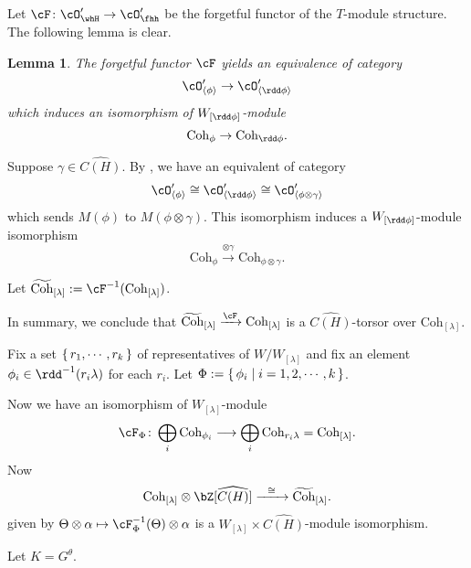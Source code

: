 \documentclass[12pt,a4paper]{amsart}
\numberwithin{equation}{section}
\newtheorem{lem}[thm]{Lemma}
\theoremstyle{remark}
\def\Coh{\mathrm{Coh}}
\def\dphi{\rdd \phi}
\def\whCPH{\widehat{C(H)}}
\begin{document}
Let $\cF\colon \cO'_{\whH}\rightarrow \cO'_{\fhh}$ be the forgetful functor of
the $T$-module structure.
The following lemma is clear.
\begin{lem}\label{lem:eqcat}
  The forgetful functor $\cF$ yields an equivalence of
  category
  \[
    \cO'_{\braket{\phi}}\rightarrow \cO'_{\braket{\rdd\phi}}
  \]
  which induces an isomorphism of $W_{[\dphi]}$-module
  \[
    \Coh_{\phi}\rightarrow \Coh_{\rdd\phi}.
  \]
\end{lem}
Suppose $\gamma\in \whCPH$.
By , we have an equivalent of category
\[
  \cO'_{\braket{\phi}}\cong \cO'_{\braket{\rdd\phi}}\cong \cO'_{\braket{\phi\otimes \gamma}}
\]
which sends $M(\phi)$ to $M(\phi\otimes \gamma)$.
This isomorphism induces a $W_{[\dphi]}$-module isomorphism
\[
    \Coh_{\phi}\xrightarrow{\otimes \gamma} \Coh_{\phi\otimes \gamma}.
\]

\def\tCoh{\widetilde{\Coh}}
Let $\tCoh_{[\lambda]}:= \cF^{-1}(\Coh_{[\lambda]})$.

In summary, we conclude that
$
\tCoh_{[\lambda]}\xrightarrow{\cF} \Coh_{[\lambda]}
$
is a $\whCPH$-torsor over $\Coh_{[\lambda]}$.

Fix a set $\set{r_{1}, \cdots, r_{k}}$ of representatives of
$W/W_{[\lambda]}$ and fix
an element $\phi_{i}\in \rdd^{-1}(r_{i}\lambda)$ for each $r_{i}$.
Let $\Phi := \set{\phi_{i}|i=1, 2, \cdots, k}$.

Now we have an isomorphism of $W_{[\lambda]}$-module
\[
  \cF_{\Phi}\colon \bigoplus_{i}\Coh_{\phi_{i}} \longrightarrow %
  \bigoplus_{i} \Coh_{r_{i}\lambda} = \Coh_{[\lambda]}.
\]
Now
\[
  \Coh_{[\lambda]}\otimes \bZ[\whCPH]
  \xrightarrow{\ \ \cong \ \ } \tCoh_{[\lambda]}.
\]
given by $\Theta \otimes \alpha \mapsto
\cF_{\Phi}^{-1}(\Theta)\otimes \alpha$ is a
$W_{[\lambda]}\times \whCPH$-module isomorphism.



\medskip
\def\Grt{\cG}
\def\DeltaRp{\Delta^{+}_{\bR}}
Let $K = G^{\theta}$.
\end{document}
